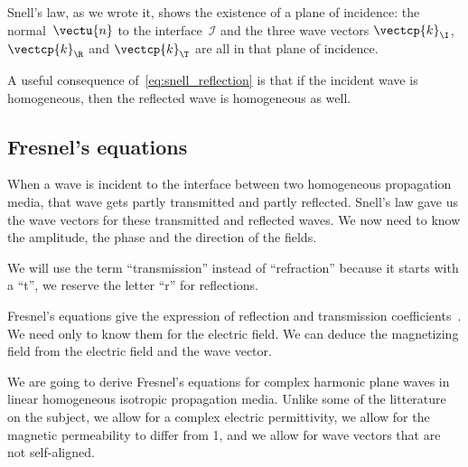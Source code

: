 \begin{refsection}
Snell's law, as we wrote it, shows the existence of a plane of incidence: the normal~$\vectu{n}$ to the interface~$\mathcal{I}$ and the three wave vectors $\vectcp{k}_\I$, $\vectcp{k}_\R$ and $\vectcp{k}_\T$ are all in that plane of incidence.

A useful consequence of~\cref{eq:snell_reflection} is that if the incident wave is homogeneous, then the reflected wave is homogeneous as well.







\subsection{Fresnel's equations}

When a wave is incident to the interface between two homogeneous propagation media, that wave gets partly transmitted and partly reflected.
Snell's law gave us the wave vectors for these transmitted and reflected waves.
We now need to know the amplitude, the phase and the direction of the fields.

We will use the term ``transmission'' instead of ``refraction'' because it starts with a ``t'', we reserve the letter ``r'' for reflections.

Fresnel's equations give the expression of reflection and transmission coefficients~\parencite{hecht2002optics}.
We need only to know them for the electric field.
We can deduce the magnetizing field from the electric field and the wave vector.

We are going to derive Fresnel's equations for complex harmonic plane waves in linear homogeneous isotropic propagation media.
Unlike some of the litterature on the subject, we allow for a complex electric permittivity, we allow for the magnetic permeability to differ from 1, and we allow for wave vectors that are not self-aligned.


\end{refsection}
